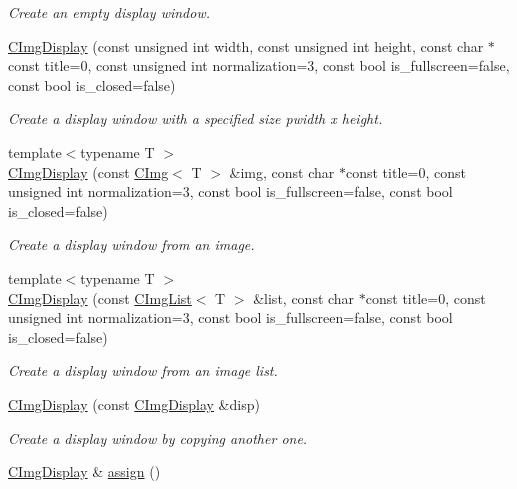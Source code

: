 \begin{DoxyCompactItemize}
\begin{DoxyCompactList}\small\item\em Create an empty display window. \item\end{DoxyCompactList}\item 
\hyperlink{structcimg__library_1_1CImgDisplay_abb46df06ee84d2be48cf5c57a9ed2f6d}{CImgDisplay} (const unsigned int width, const unsigned int height, const char $\ast$const title=0, const unsigned int normalization=3, const bool is\_\-fullscreen=false, const bool is\_\-closed=false)
\begin{DoxyCompactList}\small\item\em Create a display window with a specified size {\ttfamily pwidth} x {\ttfamily height}. \item\end{DoxyCompactList}\item 
{\footnotesize template$<$typename T $>$ }\\\hyperlink{structcimg__library_1_1CImgDisplay_a17a3e5d3c1452bea980a3fc27b94a62c}{CImgDisplay} (const \hyperlink{structcimg__library_1_1CImg}{CImg}$<$ T $>$ \&img, const char $\ast$const title=0, const unsigned int normalization=3, const bool is\_\-fullscreen=false, const bool is\_\-closed=false)
\begin{DoxyCompactList}\small\item\em Create a display window from an image. \item\end{DoxyCompactList}\item 
{\footnotesize template$<$typename T $>$ }\\\hyperlink{structcimg__library_1_1CImgDisplay_a381c35cf0bf2de9d41a037703d1e1ea6}{CImgDisplay} (const \hyperlink{structcimg__library_1_1CImgList}{CImgList}$<$ T $>$ \&list, const char $\ast$const title=0, const unsigned int normalization=3, const bool is\_\-fullscreen=false, const bool is\_\-closed=false)
\begin{DoxyCompactList}\small\item\em Create a display window from an image list. \item\end{DoxyCompactList}\item 
\hyperlink{structcimg__library_1_1CImgDisplay_a6765c355fa3ae998b9729b358f198a61}{CImgDisplay} (const \hyperlink{structcimg__library_1_1CImgDisplay}{CImgDisplay} \&disp)
\begin{DoxyCompactList}\small\item\em Create a display window by copying another one. \item\end{DoxyCompactList}\item 
\hypertarget{structcimg__library_1_1CImgDisplay_a816d8c873ae3d27854bd0620646224b9}{
\hyperlink{structcimg__library_1_1CImgDisplay}{CImgDisplay} \& \hyperlink{structcimg__library_1_1CImgDisplay_a816d8c873ae3d27854bd0620646224b9}{assign} ()}
\label{structcimg__library_1_1CImgDisplay_a816d8c873ae3d27854bd0620646224b9}


\end{DoxyCompactItemize}
